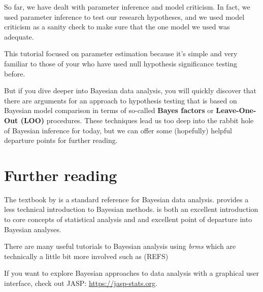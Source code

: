 \documentclass[nobib]{tufte-handout}
\begin{document}
So far, we have dealt with parameter inference and model criticism. In fact, we used parameter inference to test our research hypotheses, and we used model criticism as a sanity check to
make sure that the one model we used was adequate.

This tutorial focused on parameter estimation because it's simple and very familiar to those of your who have used null hypothesis significance testing before.

But if you dive deeper into Bayesian data analysis, you will quickly discover that there are arguments
\citep[e.g.][]{VandekerckhoveMatzke2015:Model-Compariso}
for an approach to hypothesis testing that is based on Bayesian model comparison in terms of
so-called \textbf{Bayes factors}
\citep{Jeffreys1961:Theory-of-Proba,KassRaftery1995:Bayes-Factors} 
or \textbf{Leave-One-Out (LOO)} procedures. These techniques lead us too deep into the rabbit hole of Bayesian inference for today, but we can offer some (hopefully) helpful departure points for further reading.

\section{Further reading}

The textbook by \citet{GelmanCarlin2014:Bayesian-Data-A} is a standard reference for Bayesian
data analysis. \citet{Kruschke2011:Doing-Bayesian-} provides a less technical introduction to Bayesian methods. \citet{McElreath2016:Statistical-Ret} is both an excellent introduction to core concepts of statistical analysis and and excellent point of departure into Bayesian analyses.
  
There are many useful tutorials to Bayesian analysis using \emph{brms} which are technically a little bit more involved such as (REFS)

If you want to explore Bayesian approaches to data analysis with a graphical user interface, check out JASP: \url{https://jasp-stats.org}. 








\printbibliography[heading=bibintoc]
\end{document}
